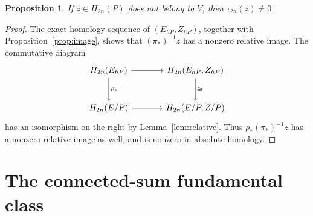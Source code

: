 \documentclass[11pt]{article}
\newtheorem{proposition}[theorem]{Proposition}
\theoremstyle{remark}
\begin{document}
\begin{proposition}\label{prop:survival}
If \(z\in H_{2n}(P)\) does not belong to \(V\), then
\(\tau_{2n}(z)\neq0\).
\end{proposition}

\begin{proof}
The exact homology sequence of \((E_{hP},Z_{hP})\), together with
Proposition~\ref{prop:image}, shows that \((\pi_*)^{-1}z\) has a
nonzero relative image. The commutative diagram
\[
\begin{tikzcd}[column sep=large,row sep=large]
 H_{2n}(E_{hP}) \arrow[r] \arrow[d,"\rho_*"] &
 H_{2n}(E_{hP},Z_{hP}) \arrow[d,"\cong"]\\
 H_{2n}(E/P) \arrow[r] & H_{2n}(E/P,Z/P)
\end{tikzcd}
\]
has an isomorphism on the right by Lemma~\ref{lem:relative}.
Thus \(\rho_*(\pi_*)^{-1}z\) has a nonzero relative image as well,
and is nonzero in absolute homology.
\end{proof}

\section{The connected-sum fundamental class}
\end{document}
